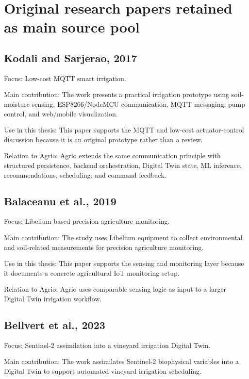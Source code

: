 \section{Original research papers retained as main source pool}

\subsection{Kodali and Sarjerao, 2017}

Focus: Low-cost MQTT smart irrigation.

Main contribution: The work presents a practical irrigation prototype using soil-moisture sensing, ESP8266/NodeMCU communication, MQTT messaging, pump control, and web/mobile visualization.

Use in this thesis: This paper supports the MQTT and low-cost actuator-control discussion because it is an original prototype rather than a review.

Relation to Agrio: Agrio extends the same communication principle with structured persistence, backend orchestration, Digital Twin state, ML inference, recommendations, scheduling, and command feedback.

\subsection{Balaceanu et al., 2019}

Focus: Libelium-based precision agriculture monitoring.

Main contribution: The study uses Libelium equipment to collect environmental and soil-related measurements for precision agriculture monitoring.

Use in this thesis: This paper supports the sensing and monitoring layer because it documents a concrete agricultural IoT monitoring setup.

Relation to Agrio: Agrio uses comparable sensing logic as input to a larger Digital Twin irrigation workflow.

\subsection{Bellvert et al., 2023}

Focus: Sentinel-2 assimilation into a vineyard irrigation Digital Twin.

Main contribution: The work assimilates Sentinel-2 biophysical variables into a Digital Twin to support automated vineyard irrigation scheduling.

